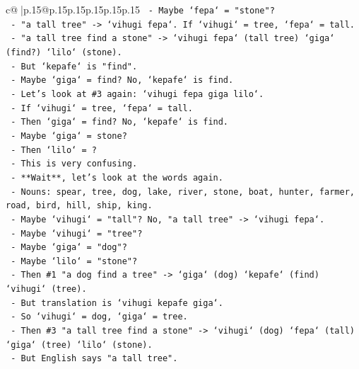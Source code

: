 \documentclass{article}
\begin{document}
{\begin{supertabular}{c@{$\;$}|p{.15\linewidth}@{}p{.15\linewidth}p{.15\linewidth}p{.15\linewidth}p{.15\linewidth}p{.15\linewidth}}
{{{\texttt{                {-}   Maybe `fepa` = "stone"?} \\
\texttt{                {-}   "a tall tree" {-}> `vihugi fepa`. If `vihugi` = tree, `fepa` = tall.} \\
\texttt{                {-}   "a tall tree find a stone" {-}> `vihugi fepa` (tall tree) `giga` (find?) `lilo` (stone).} \\
\texttt{                {-}   But `kepafe` is "find".} \\
\texttt{                {-}   Maybe `giga` = find? No, `kepafe` is find.} \\
\texttt{                {-}   Let's look at \#3 again: `vihugi fepa giga lilo`.} \\
\texttt{                {-}   If `vihugi` = tree, `fepa` = tall.} \\
\texttt{                {-}   Then `giga` = find? No, `kepafe` is find.} \\
\texttt{                {-}   Maybe `giga` = stone?} \\
\texttt{                {-}   Then `lilo` = ?} \\
\texttt{                {-}   This is very confusing.} \\
\texttt{                {-}   **Wait**, let's look at the words again.} \\
\texttt{                {-}   Nouns: spear, tree, dog, lake, river, stone, boat, hunter, farmer, road, bird, hill, ship, king.} \\
\texttt{                {-}   Maybe `vihugi` = "tall"? No, "a tall tree" {-}> `vihugi fepa`.} \\
\texttt{                {-}   Maybe `vihugi` = "tree"?} \\
\texttt{                {-}   Maybe `giga` = "dog"?} \\
\texttt{                {-}   Maybe `lilo` = "stone"?} \\
\texttt{                {-}   Then \#1 "a dog find a tree" {-}> `giga` (dog) `kepafe` (find) `vihugi` (tree).} \\
\texttt{                {-}   But translation is `vihugi kepafe giga`.} \\
\texttt{                {-}   So `vihugi` = dog, `giga` = tree.} \\
\texttt{                {-}   Then \#3 "a tall tree find a stone" {-}> `vihugi` (dog) `fepa` (tall) `giga` (tree) `lilo` (stone).} \\
\texttt{                {-}   But English says "a tall tree".} \\
}}}
\end{supertabular}}
\end{document}
